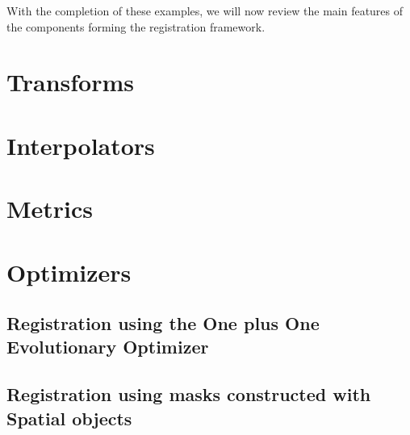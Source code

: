 With the completion of these examples, we will now review the main
features of the components forming the registration framework.


\clearpage

\section{Transforms}
\label{sec:Transforms}
\ifitkFullVersion

\fi



\clearpage

\section{Interpolators}
\label{sec:Interpolators}
\ifitkFullVersion

\fi

\clearpage

\section{Metrics}
\label{sec:Metrics}
\ifitkFullVersion

\fi

\clearpage

\section{Optimizers}
\label{sec:Optimizers}
\ifitkFullVersion

\fi



\subsection{Registration using the One plus One Evolutionary Optimizer}
\label{sec:RegistrationOnePlusOne}
\ifitkFullVersion

\fi



\subsection{Registration using masks constructed with Spatial objects}
\label{sec:RegistrationSpatialObjects}
\ifitkFullVersion

\fi



